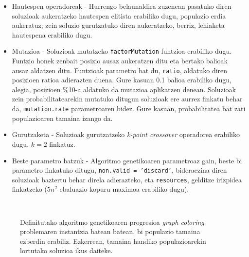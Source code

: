 \documentclass[eu]{ifirak}\usepackage[]{graphicx}\usepackage[]{color}
\newcommand{\code}[1]{\texttt{#1}}
\newcommand{\eng}[1]{\textit{#1}}
\begin{document}
\begin{itemize}
\item Hautespen operadoreak - Hurrengo belaunaldira zuzenean pasatuko diren soluzioak aukeratzeko hautespen elitista erabiliko dugu, populazio erdia aukeratuz; zein soluzio gurutzatuko diren aukeratzeko, berriz, lehiaketa hautespena erabiliko dugu.
\item Mutazioa - Soluzioak mutatzeko \code{factorMutation} funtzioa erabiliko dugu. Funtzio honek zenbait posizio ausaz aukeratzen ditu eta bertako balioak ausaz aldatzen ditu. Funtzioak parametro bat du, \code{ratio}, aldatuko diren posizioen ratioa adierazten duena. Gure kasuan 0.1 balioa erabiliko dugu, alegia, posizioen \%10-a aldatuko da mutazioa aplikatzen denean. Soluzioak zein probabilitatearekin mutatuko ditugun soluzioak ere aurrez finkatu behar da, \code{mutation.rate} parametroaren bidez. Gure kasuan, probabilitatea bat zati populazioaren tamaina izango da.
\item Gurutzaketa - Soluzioak gurutzatzeko \eng{k-point crossover} operadorea erabiliko dugu, $k = 2$ finkatuz. 
\item Beste parametro batzuk - Algoritmo genetikoaren parametroaz gain, beste bi parametro finkatuko ditugu, \code{non.valid = 'discard'}, bideraezina diren soluzioak baztertu behar direla adierazteko, eta \code{resources}, gelditze irizpidea finkatzeko ($5n^2$ ebaluazio kopuru maximoa erabiliko dugu).
\end{itemize}

\begin{figure}[t]
\qquad
{}\\
\caption{Definitutako algoritmo genetikoaren progresioa \eng{graph coloring} problemaren instantzia batean batean, bi populazio tamaina ezberdin erabiliz. Ezkerrean, tamaina handiko populazioarekin lortutako soluzioa ikus daiteke.}\label{fig:ga_progress}
\end{figure}
\end{document}
